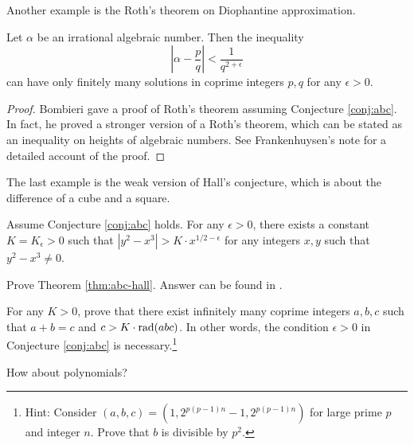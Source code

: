 Another example is the Roth's theorem on Diophantine approximation.
\begin{theorem}
    Let $\alpha$ be an irrational algebraic number.
    Then the inequality
    \[
    \left| \alpha - \frac{p}{q} \right| < \frac{1}{q^{2 + \epsilon}}
    \]
    can have only finitely many solutions in coprime integers \( p, q \) for any \( \epsilon > 0 \).
\end{theorem}
\begin{proof}
    Bombieri \cite{bombieri1994roth} gave a proof of Roth's theorem assuming Conjecture \ref{conj:abc}.
    In fact, he proved a stronger version of a Roth's theorem, which can be stated as an inequality on heights of algebraic numbers.
    See Frankenhuysen's note \cite{frankenhuysen} for a detailed account of the proof.
\end{proof}

The last example is the weak version of Hall's conjecture, which is about the difference of a cube and a square.
\begin{theorem}
    \label{thm:abc-hall}
    Assume Conjecture \ref{conj:abc} holds.
    For any \( \epsilon > 0 \), there exists a constant \( K = K_\epsilon > 0 \) such that \( | y^2 - x^3 | > K \cdot x^{1 / 2 - \epsilon} \) for any  integers \( x, y \) such that \( y^2 - x^3 \ne 0 \).
\end{theorem}

\begin{exercise}
    Prove Theorem \ref{thm:abc-hall}.
    Answer can be found in \cite{schmidt2006diophantine}.
\end{exercise}

\begin{exercise}
    For any $K > 0$, prove that there exist infinitely many coprime integers \( a, b, c \) such that \( a + b = c \) and \( c > K \cdot \mathrm{rad}(abc) \).
    In other words, the condition \( \epsilon > 0 \) in Conjecture \ref{conj:abc} is necessary.\footnote{Hint: Consider \( (a, b, c) = (1, 2^{p(p-1)n} - 1, 2^{p(p-1)n})\) for large prime \( p \) and integer \( n \). Prove that \( b \) is divisible by \( p^2 \).}
\end{exercise}

How about polynomials?



\newpage